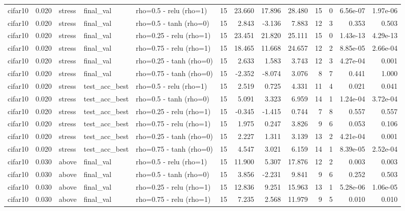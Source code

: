 \begin{table}[htbp]
{\begin{tabular}{@{}lrlllrrrrrrrr@{}}
cifar10 & 0.020 & stress & final\_val & rho=0.5 - relu (rho=1) & 15 & 23.660 & 17.896 & 28.480 & 15 & 0 & 6.56e-07 & 1.97e-06 \\
cifar10 & 0.020 & stress & final\_val & rho=0.5 - tanh (rho=0) & 15 & 2.843 & -3.136 & 7.883 & 12 & 3 & 0.353 & 0.503 \\
cifar10 & 0.020 & stress & final\_val & rho=0.25 - relu (rho=1) & 15 & 23.451 & 21.820 & 25.111 & 15 & 0 & 1.43e-13 & 4.29e-13 \\
cifar10 & 0.020 & stress & final\_val & rho=0.75 - relu (rho=1) & 15 & 18.465 & 11.668 & 24.657 & 12 & 2 & 8.85e-05 & 2.66e-04 \\
cifar10 & 0.020 & stress & final\_val & rho=0.25 - tanh (rho=0) & 15 & 2.633 & 1.583 & 3.743 & 12 & 3 & 4.27e-04 & 0.001 \\
cifar10 & 0.020 & stress & final\_val & rho=0.75 - tanh (rho=0) & 15 & -2.352 & -8.074 & 3.076 & 8 & 7 & 0.441 & 1.000 \\
cifar10 & 0.020 & stress & test\_acc\_best & rho=0.5 - relu (rho=1) & 15 & 2.519 & 0.725 & 4.331 & 11 & 4 & 0.021 & 0.041 \\
cifar10 & 0.020 & stress & test\_acc\_best & rho=0.5 - tanh (rho=0) & 15 & 5.091 & 3.323 & 6.959 & 14 & 1 & 1.24e-04 & 3.72e-04 \\
cifar10 & 0.020 & stress & test\_acc\_best & rho=0.25 - relu (rho=1) & 15 & -0.345 & -1.415 & 0.744 & 7 & 8 & 0.557 & 0.557 \\
cifar10 & 0.020 & stress & test\_acc\_best & rho=0.75 - relu (rho=1) & 15 & 1.975 & 0.247 & 3.826 & 9 & 6 & 0.053 & 0.106 \\
cifar10 & 0.020 & stress & test\_acc\_best & rho=0.25 - tanh (rho=0) & 15 & 2.227 & 1.311 & 3.139 & 13 & 2 & 4.21e-04 & 0.001 \\
cifar10 & 0.020 & stress & test\_acc\_best & rho=0.75 - tanh (rho=0) & 15 & 4.547 & 3.021 & 6.159 & 14 & 1 & 8.39e-05 & 2.52e-04 \\
cifar10 & 0.030 & above & final\_val & rho=0.5 - relu (rho=1) & 15 & 11.900 & 5.307 & 17.876 & 12 & 2 & 0.003 & 0.003 \\
cifar10 & 0.030 & above & final\_val & rho=0.5 - tanh (rho=0) & 15 & 3.856 & -2.231 & 9.841 & 9 & 6 & 0.252 & 0.503 \\
cifar10 & 0.030 & above & final\_val & rho=0.25 - relu (rho=1) & 15 & 12.836 & 9.251 & 15.963 & 13 & 1 & 5.28e-06 & 1.06e-05 \\
cifar10 & 0.030 & above & final\_val & rho=0.75 - relu (rho=1) & 15 & 7.235 & 2.568 & 11.979 & 9 & 5 & 0.010 & 0.010 \\

\end{tabular}}
\end{table}
